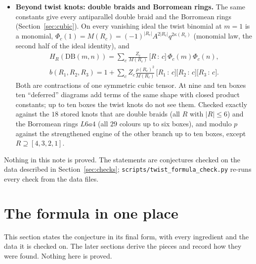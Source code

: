 \documentclass[11pt]{article}
\newcommand{\LMPH}[1]{\texttt{#1}}
\newcommand{\cf}[2]{\bigl[#1\,{:}\,#2\bigr]}
\begin{document}
\begin{itemize}
\item \textbf{Beyond twist knots: double braids and Borromean rings.}  The same constants give every antiparallel
double braid and the Borromean rings (Section~\ref{sec:cubic}).  On every vanishing ideal the twist binomial at $m=1$
is a monomial, $\Phi_c(1)=M(R_c)=(-1)^{|R_c|}A^{2|R_c|}q^{2\kappa(R_c)}$ (monomial law, the second half of the ideal
identity), and
\begin{gather*}
H_R(\mathrm{DB}(m,n))=\sum_c\frac{Z_c}{M(R_c)}\,\cf Rc\,\Phi_c(m)\Phi_c(n),\\
b(R_1,R_2,R_3)=1+\sum_cZ_c\frac{\rho(R_c)^2}{M(R_c)}\,\cf{R_1}c\cf{R_2}c\cf{R_3}c .
\end{gather*}
Both are contractions of one symmetric cubic tensor.  At nine and ten boxes ten ``deferred'' diagrams add terms of the
same shape with closed product constants; up to ten boxes the twist knots do not see them.  Checked exactly against the
$18$ stored knots that are double braids (all $R$ with $|R|\le6$) and the Borromean rings $L6a4$ (all $29$ colours up to
six boxes), and modulo $p$ against the strengthened engine of the other branch up to ten boxes, except $R\supseteq[4,3,2,1]$.
\end{itemize}

Nothing in this note is proved.  The statements are conjectures checked on the data described in
Section~\ref{sec:checks}; \LMPH{scripts/twist\_formula\_check.py} re-runs every check from the data files.

\section{The formula in one place}\label{sec:onepage}

This section states the conjecture in its final form, with every ingredient and the data it is checked on.  The later
sections derive the pieces and record how they were found.  Nothing here is proved.
\end{document}
